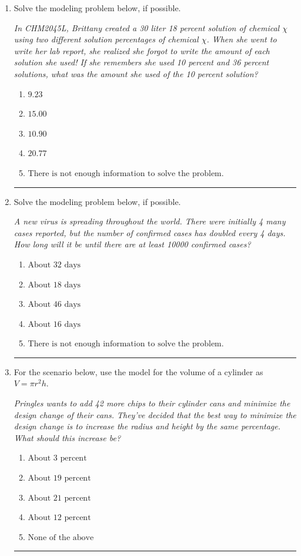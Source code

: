 \documentclass[14pt]{extbook}
\newcommand{\litem}[1]{\item#1\hspace*{-1cm}\rule{\textwidth}{0.4pt}}
\begin{document}
\begin{enumerate}
{\begin{enumerate}[label=\Alph*.]
\end{enumerate} }
\litem{
Solve the modeling problem below, if possible.
\begin{center}
    \textit{ In CHM2045L, Brittany created a 30 liter 18 percent solution of chemical $\chi$ using two different solution percentages of chemical $\chi$. When she went to write her lab report, she realized she forgot to write the amount of each solution she used! If she remembers she used 10 percent and 36 percent solutions, what was the amount she used of the 10 percent solution? }
\end{center}
\begin{enumerate}[label=\Alph*.]
\item \( 9.23 \)
\item \( 15.00 \)
\item \( 10.90 \)
\item \( 20.77 \)
\item \( \text{There is not enough information to solve the problem.} \)

\end{enumerate} }
\litem{
Solve the modeling problem below, if possible.
\begin{center}
    \textit{ A new virus is spreading throughout the world. There were initially 4 many cases reported, but the number of confirmed cases has doubled every 4 days. How long will it be until there are at least 10000 confirmed cases? }
\end{center}
\begin{enumerate}[label=\Alph*.]
\item \( \text{About } 32 \text{ days} \)
\item \( \text{About } 18 \text{ days} \)
\item \( \text{About } 46 \text{ days} \)
\item \( \text{About } 16 \text{ days} \)
\item \( \text{There is not enough information to solve the problem.} \)

\end{enumerate} }
\litem{
For the scenario below, use the model for the volume of a cylinder as $V = \pi r^2 h$.
\begin{center}
    \textit{ Pringles wants to add 42 \text{percent} more chips to their cylinder cans and minimize the design change of their cans. They've decided that the best way to minimize the design change is to increase the radius and height by the same percentage. What should this increase be? }
\end{center}
\begin{enumerate}[label=\Alph*.]
\item \( \text{About } 3 \text{ percent} \)
\item \( \text{About } 19 \text{ percent} \)
\item \( \text{About } 21 \text{ percent} \)
\item \( \text{About } 12 \text{ percent} \)
\item \( \text{None of the above} \)


\end{enumerate}}
\end{enumerate}
\end{document}
